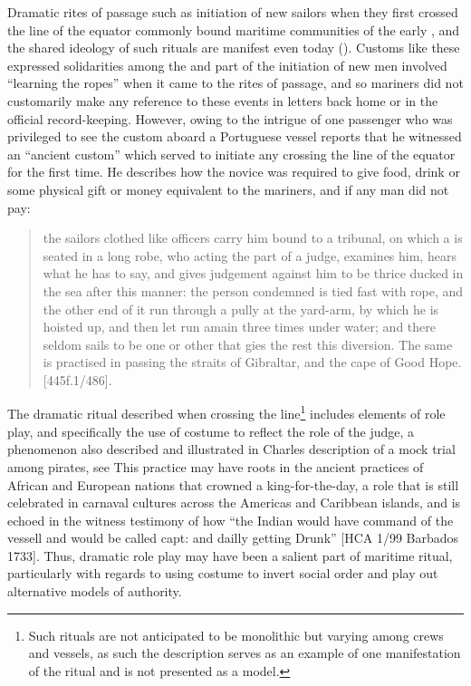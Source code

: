Dramatic rites of passage such as initiation of new sailors when they first crossed the line of the equator commonly bound maritime communities of the early , and the shared ideology of such rituals are manifest even today (\citealt{Bronner2006}). Customs like these expressed solidarities among the  and part of the initiation of new men involved “learning the ropes” when it came to the rites of passage, and so mariners did not customarily make any reference to these events in letters back home or in the official record-keeping. However, owing to the intrigue of one passenger who was privileged to see the custom aboard a  Portuguese vessel reports that he witnessed an “ancient custom” which served to initiate any  crossing the line of the equator for the first time. He describes how the novice  was required to give food, drink or some physical gift or money equivalent to the mariners, and if any man did not pay: 

\begin{quotation}
the sailors clothed like officers carry him bound to a tribunal, on which a  is seated in a long robe, who acting the part of a judge, examines him, hears what he has to say, and gives judgement against him to be thrice ducked in the sea after this manner: the person condemned is tied fast with rope, and the other end of it run through a pully at the yard-arm, by which he is hoisted up, and then let run amain three times under water; and there seldom sails to be one or other that gies the rest this diversion. The same is practised in passing the straits of Gibraltar, and the cape of Good Hope. [445f.1/486]. 
\end{quotation}

The dramatic ritual described when crossing the line\footnote{Such rituals are not anticipated to be monolithic but varying among crews and vessels, as such the description serves as an example of one manifestation of the ritual and is not presented as a model.}  includes elements of role play, and specifically the use of costume to reflect the role of the judge, a phenomenon also described and illustrated in Charles  description of a mock trial among pirates, see  This practice may have roots in the ancient practices of African and European nations that crowned a king-for-the-day, a role that is still celebrated in carnaval cultures across the Americas and Caribbean islands, and is echoed in the witness testimony of how “the Indian would have command of the vessell and would be called capt: and dailly getting Drunk” [HCA 1/99 Barbados {1733}]. Thus, dramatic role play may have been a salient part of maritime ritual, particularly with regards to using costume to invert social order and play out alternative models of authority. 


